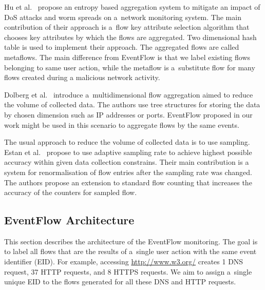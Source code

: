 Hu et al.~\cite{Hu-2009-Entropy} propose an entropy based aggregation system to mitigate an impact of DoS attacks and worm spreads on a~network monitoring system. The main contribution of their approach is a~flow key attribute selection algorithm that chooses key attributes by which the flows are aggregated. Two dimensional hash table is used to implement their approach. The aggregated flows are called metaflows. The main difference from EventFlow is that we label existing flows belonging to same user action, while the metaflow is a~substitute flow for many flows created during a malicious network activity.

Dolberg et al.~\cite{Dolberg-2012-Efficient} introduce a~multidimensional flow aggregation aimed to reduce the volume of collected data. The authors use tree structures for storing the data by chosen dimension such as IP addresses or ports. EventFlow proposed in our work might be used in this scenario to aggregate flows by the same events.

The usual approach to reduce the volume of collected data is to use sampling. Estan et al.~\cite{Estan-2004-Building} propose to use adaptive sampling rate to achieve highest possible accuracy within given data collection constrains. Their main contribution is a system for renormalisation of flow entries after the sampling rate was changed. The authors propose an extension to standard flow counting that increases the accuracy of the counters for sampled flow.


\subsection{EventFlow Architecture} \label{subsec:eventflow-architecture}

This section describes the architecture of the EventFlow monitoring. The goal is to label all flows that are the results of a~single user action with the same event identifier (EID). For example, accessing \url{http://www.w3.org/} creates 1 DNS request, 37 HTTP requests, and 8 HTTPS requests. We aim to assign a~single unique EID to the flows generated for all these DNS and HTTP requests.

